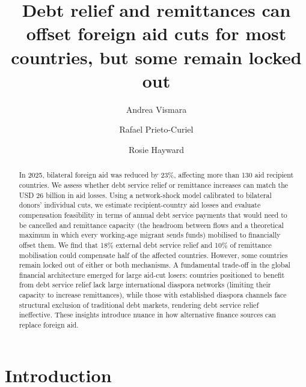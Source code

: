 \documentclass[fleqn,10pt,twocolumn]{wlscirep}
\begin{document}
\title{\Large Debt relief and remittances can offset foreign aid cuts for most countries, but some remain locked out}

\author[1,3,*]{\small Andrea Vismara}
\author[1]{\small Rafael Prieto-Curiel}
\author[2]{\small Rosie Hayward}


\begin{abstract}

In 2025, bilateral foreign aid was reduced by 23\%, affecting more than 130 aid recipient countries. We assess whether debt service relief or remittance increases can match the USD 26 billion in aid losses. Using a network-shock model calibrated to bilateral donors' individual cuts, we estimate recipient-country aid losses and evaluate compensation feasibility in terms of annual debt service payments that would need to be cancelled and remittance capacity (the headroom between flows and a theoretical maximum in which every working-age migrant sends funds) mobilised to financially offset them. We find that 18\% external debt service relief and 10\% of remittance mobilisation could compensate half of the affected countries. However, some countries remain locked out of either or both mechanisms. A fundamental trade-off in the global financial architecture emerged for large aid-cut losers: countries positioned to benefit from debt service relief lack large international diaspora networks (limiting their capacity to increase remittances), while those with established diaspora channels face structural exclusion of traditional debt markets, rendering debt service relief ineffective. These insights introduce nuance in how alternative finance sources can replace foreign aid.
\end{abstract}


\maketitle

\section*{Introduction}
 
\end{document}
